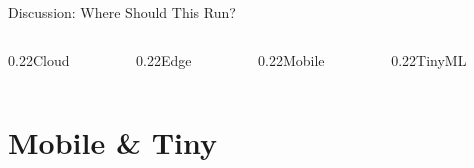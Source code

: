 \documentclass[aspectratio=169, 12pt]{beamer}
\begin{document}
\begin{frame}{Discussion: Where Should This Run?}
\vspace{0.25cm}
\begin{columns}[c]
  \begin{column}{0.22\textwidth}\centering\small\textcolor{computestroke}{Cloud}\end{column}
  \begin{column}{0.22\textwidth}\centering\small\textcolor{datastroke}{Edge}\end{column}
  \begin{column}{0.22\textwidth}\centering\small\textcolor{routingstroke}{Mobile}\end{column}
  \begin{column}{0.22\textwidth}\centering\small\textcolor{errorstroke}{TinyML}\end{column}
\end{columns}

\end{frame}

\section{Mobile \& Tiny}
\end{document}
